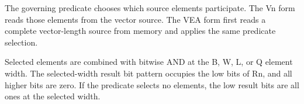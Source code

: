The governing predicate chooses which source elements participate. The Vn form
reads those elements from the vector source. The VEA form first reads a complete
vector-length source from memory and applies the same predicate selection.

Selected elements are combined with bitwise AND at the B, W, L, or Q element
width. The selected-width result bit pattern occupies the low bits of Rn, and
all higher bits are zero. If the predicate selects no elements, the low result
bits are all ones at the selected width.
